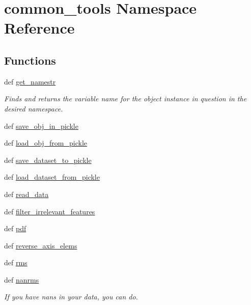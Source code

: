 \hypertarget{namespacecommon__tools}{\section{common\+\_\+tools Namespace Reference}
\label{namespacecommon__tools}
}
\subsection*{Functions}
\begin{DoxyCompactItemize}
\item 
def \hyperlink{namespacecommon__tools_a99127ed524481a987098d0b646248ac7}{get\+\_\+namestr}
\begin{DoxyCompactList}\small\item\em Finds and returns the variable name for the object instance in question in the desired namespace. \end{DoxyCompactList}\item 
def \hyperlink{namespacecommon__tools_a31bbee936ad9ee3f26d71ba58c435125}{save\+\_\+obj\+\_\+in\+\_\+pickle}
\item 
def \hyperlink{namespacecommon__tools_ae02aaf0ee60b16dd5d22f2e3f20fd9e6}{load\+\_\+obj\+\_\+from\+\_\+pickle}
\item 
def \hyperlink{namespacecommon__tools_ae5d41b7419e727e4389ae0a37f684a7f}{save\+\_\+dataset\+\_\+to\+\_\+pickle}
\item 
def \hyperlink{namespacecommon__tools_a38d5594d132460ab544508a860c74840}{load\+\_\+dataset\+\_\+from\+\_\+pickle}
\item 
def \hyperlink{namespacecommon__tools_a7987ebb2fe78986ee5bd276b9ca23b54}{read\+\_\+data}
\item 
def \hyperlink{namespacecommon__tools_aaa8d6759ce602c7555a4f247523a7b17}{filter\+\_\+irrelevant\+\_\+features}
\item 
def \hyperlink{namespacecommon__tools_a0f555f84922eeeeef319b1c696a53398}{pdf}
\item 
def \hyperlink{namespacecommon__tools_affa5e6fbad6fb93eafef8208833518ac}{reverse\+\_\+axis\+\_\+elems}
\item 
def \hyperlink{namespacecommon__tools_a3c8bdaaa99b2ded40cae5110fe429dc9}{rms}
\item 
def \hyperlink{namespacecommon__tools_ac61789513b883ed1c0519fafbc04db09}{nanrms}
\begin{DoxyCompactList}\small\item\em If you have nans in your data, you can do. \end{DoxyCompactList}\item 

\end{DoxyCompactItemize}
